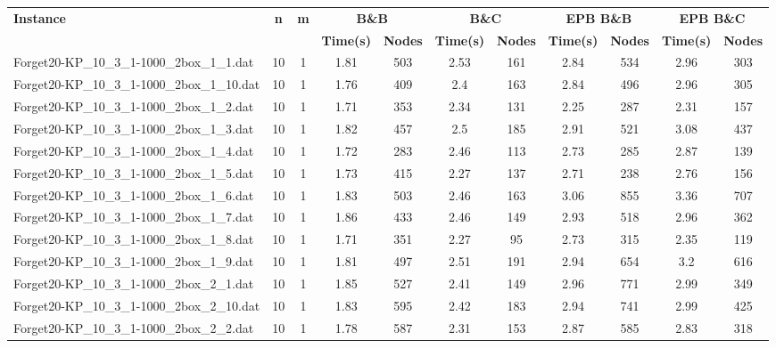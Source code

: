 \begin{table}[!ht]
\centering
\hspace*{-1cm}\begin{tabular}{lcccccccccc}
\toprule
\textbf{Instance} & \textbf{n} & \textbf{m} & \multicolumn{2}{c}{\textbf{B\&B}} & \multicolumn{2}{c}{\textbf{B\&C}}  & \multicolumn{2}{c}{\textbf{EPB B\&B}} & \multicolumn{2}{c}{\textbf{EPB B\&C}} \\

\cmidrule(r){4-5} \cmidrule(r){6-7} \cmidrule(r){8-9} \cmidrule(r){10-11} 
~ & ~ & ~ & \textbf{Time(s)} &\textbf{Nodes} & \textbf{Time(s)} &\textbf{Nodes} & \textbf{Time(s)} &\textbf{Nodes} & \textbf{Time(s)} &\textbf{Nodes}  \\
\midrule

Forget20-KP\_10\_3\_1-1000\_2box\_1\_1.dat & 10 & 1 & 1.81 & 503 & 2.53 & 161 & 2.84 & 534 & 2.96 & 303 \\
Forget20-KP\_10\_3\_1-1000\_2box\_1\_10.dat & 10 & 1 & 1.76 & 409 & 2.4 & 163 & 2.84 & 496 & 2.96 & 305 \\
Forget20-KP\_10\_3\_1-1000\_2box\_1\_2.dat & 10 & 1 & 1.71 & 353 & 2.34 & 131 & 2.25 & 287 & 2.31 & 157 \\
Forget20-KP\_10\_3\_1-1000\_2box\_1\_3.dat & 10 & 1 & 1.82 & 457 & 2.5 & 185 & 2.91 & 521 & 3.08 & 437 \\
Forget20-KP\_10\_3\_1-1000\_2box\_1\_4.dat & 10 & 1 & 1.72 & 283 & 2.46 & 113 & 2.73 & 285 & 2.87 & 139 \\
Forget20-KP\_10\_3\_1-1000\_2box\_1\_5.dat & 10 & 1 & 1.73 & 415 & 2.27 & 137 & 2.71 & 238 & 2.76 & 156 \\
Forget20-KP\_10\_3\_1-1000\_2box\_1\_6.dat & 10 & 1 & 1.83 & 503 & 2.46 & 163 & 3.06 & 855 & 3.36 & 707 \\
Forget20-KP\_10\_3\_1-1000\_2box\_1\_7.dat & 10 & 1 & 1.86 & 433 & 2.46 & 149 & 2.93 & 518 & 2.96 & 362 \\
Forget20-KP\_10\_3\_1-1000\_2box\_1\_8.dat & 10 & 1 & 1.71 & 351 & 2.27 & 95 & 2.73 & 315 & 2.35 & 119 \\
Forget20-KP\_10\_3\_1-1000\_2box\_1\_9.dat & 10 & 1 & 1.81 & 497 & 2.51 & 191 & 2.94 & 654 & 3.2 & 616 \\
Forget20-KP\_10\_3\_1-1000\_2box\_2\_1.dat & 10 & 1 & 1.85 & 527 & 2.41 & 149 & 2.96 & 771 & 2.99 & 349 \\
Forget20-KP\_10\_3\_1-1000\_2box\_2\_10.dat & 10 & 1 & 1.83 & 595 & 2.42 & 183 & 2.94 & 741 & 2.99 & 425 \\
Forget20-KP\_10\_3\_1-1000\_2box\_2\_2.dat & 10 & 1 & 1.78 & 587 & 2.31 & 153 & 2.87 & 585 & 2.83 & 318 \\

\end{tabular}
\end{table}
